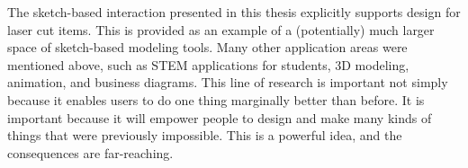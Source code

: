 The sketch-based interaction presented in this thesis explicitly
supports design for laser cut items. This is provided as an example of
a (potentially) much larger space of sketch-based modeling tools. Many
other application areas were mentioned above, such as STEM
applications for students, 3D modeling, animation, and business
diagrams. This line of research is important not simply because it
enables users to do one thing marginally better than before. It is
important because it will empower people to design and make many kinds
of things that were previously impossible. This is a powerful idea,
and the consequences are far-reaching.

